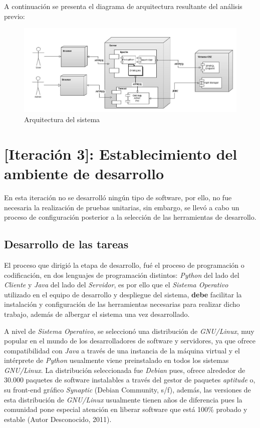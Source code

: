 A continuación se presenta el diagrama de arquitectura resultante del análisis previo:

\begin{figure}[h!]
    \begin{center}
        \includegraphics[scale=0.4]{images/sysArch.jpg}
        \caption{Arquitectura del sistema}
        \label{systemArchitecture}
    \end{center}
\end{figure}

\section{[Iteración 3]: Establecimiento del ambiente de desarrollo}
En esta iteración no se desarrolló ningún tipo de software, por ello, no fue necesaria la realización de pruebas unitarias, sin embargo, se llevó a cabo un proceso de configuración posterior a la selección de las herramientas de desarrollo.

\subsection{Desarrollo de las tareas}
El proceso que dirigió la etapa de desarrollo, fué el proceso de programación o codificación, en dos lenguajes de programación distintos: \textit{Python} del lado del \textit{Cliente} y \textit{Java} del lado del \textit{Servidor}, es por ello que el \textit{Sistema Operativo} utilizado en el equipo de desarrollo y despliegue del sistema, \textbf{debe} facilitar la instalación y configuración de las herramientas necesarias para realizar dicho trabajo, además de albergar el sistema una vez desarrollado.

A nivel de \textit{Sistema Operativo}, se seleccionó una distribución de \textit{GNU/Linux}, muy popular en el mundo de los desarrolladores de software y servidores, ya que ofrece compatibilidad con \textit{Java} a través de una instancia de la máquina virtual y el intérprete de \textit{Python} usualmente viene preinstalado en todos los sistemas \textit{GNU/Linux}. La distribución seleccionada fue \textit{Debian} pues, ofrece alrededor de 30.000 paquetes de software instalables a través del gestor de paquetes \textit{aptitude} o, su front-end gráfico \textit{Synaptic} (Debian Community, s/f), además, las versiones de esta distribución de \textit{GNU/Linux} usualmente tienen años de diferencia pues la comunidad pone especial atención en liberar software que está 100\% probado y estable (Autor Desconocido, 2011).

